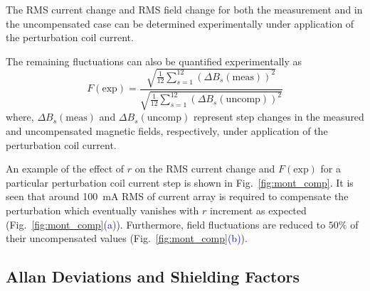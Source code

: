 The RMS current change and RMS field change for both the measurement and in the uncompensated case can be determined experimentally under application of the perturbation coil current.


The remaining fluctuations can also be quantified experimentally as
\begin{equation}\label{eq:fluc_exp}
   F(\mathrm{exp})=\frac{\sqrt{\frac{1}{12} \sum_{s=1}^{12} (\Delta B_s(\text{meas}))^2}}{\sqrt{\frac{1}{12} \sum_{s=1}^{12} (\Delta B_s(\text{uncomp}))^2}}
\end{equation}
where, $\Delta B_s(\text{meas})$ and $\Delta B_s(\text{uncomp})$ represent step changes in the measured and uncompensated magnetic fields, respectively, under application of the perturbation coil current.



An example of the effect of $r$ on the RMS current change  and $F(\mathrm{exp})$ for a particular perturbation coil current step is shown in Fig.~\ref{fig:mont_comp}. It is seen that around 100~mA RMS of current array is required to compensate the perturbation
which eventually vanishes with $r$ increment as expected (Fig.~\ref{fig:mont_comp}\textcolor{blue}{(a)}). Furthermore, field fluctuations are reduced to $50\%$ of their uncompensated values (Fig.~\ref{fig:mont_comp}\textcolor{blue}{(b)}).



 \subsection{Allan Deviations and Shielding Factors}
 

